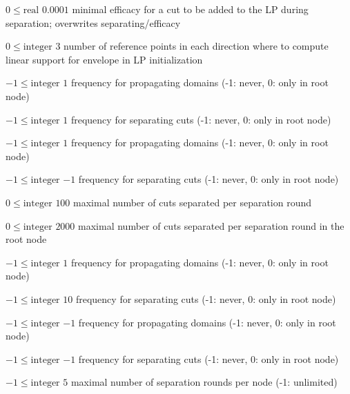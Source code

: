 %
{$0\leq\textrm{real}$}%
{$0.0001$}%
{minimal efficacy for a cut to be added to the LP during separation; overwrites separating/efficacy}%
{}

%
{$0\leq\textrm{integer}$}%
{$3$}%
{number of reference points in each direction where to compute linear support for envelope in LP initialization}%
{}

%
{$-1\leq\textrm{integer}$}%
{$1$}%
{frequency for propagating domains (-1: never, 0: only in root node)}%
{}

%
{$-1\leq\textrm{integer}$}%
{$1$}%
{frequency for separating cuts (-1: never, 0: only in root node)}%
{}

%
{$-1\leq\textrm{integer}$}%
{$1$}%
{frequency for propagating domains (-1: never, 0: only in root node)}%
{}

%
{$-1\leq\textrm{integer}$}%
{$-1$}%
{frequency for separating cuts (-1: never, 0: only in root node)}%
{}

%
{$0\leq\textrm{integer}$}%
{$100$}%
{maximal number of cuts separated per separation round}%
{}

%
{$0\leq\textrm{integer}$}%
{$2000$}%
{maximal number of cuts separated per separation round in the root node}%
{}

%
{$-1\leq\textrm{integer}$}%
{$1$}%
{frequency for propagating domains (-1: never, 0: only in root node)}%
{}

%
{$-1\leq\textrm{integer}$}%
{$10$}%
{frequency for separating cuts (-1: never, 0: only in root node)}%
{}

%
{$-1\leq\textrm{integer}$}%
{$-1$}%
{frequency for propagating domains (-1: never, 0: only in root node)}%
{}

%
{$-1\leq\textrm{integer}$}%
{$-1$}%
{frequency for separating cuts (-1: never, 0: only in root node)}%
{}

%
{$-1\leq\textrm{integer}$}%
{$5$}%
{maximal number of separation rounds per node (-1: unlimited)}%
{}

